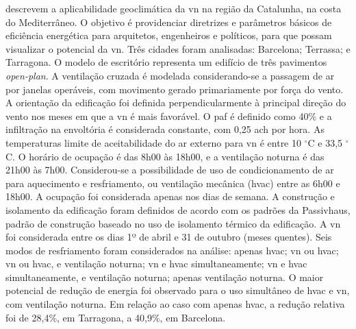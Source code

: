 \documentclass[brazil,hardcopy,openany]{ufscthesis} %
\begin{document}
 descrevem a aplicabilidade geoclimática da \acrshort{vn} na região da Catalunha, na costa do Mediterrâneo. O objetivo é providenciar diretrizes e parâmetros básicos de eficiência energética para arquitetos, engenheiros e políticos, para que possam visualizar o potencial da \acrshort{vn}. Três cidades foram analisadas: Barcelona; Terrassa; e Tarragona. O modelo de escritório representa um edifício de três pavimentos \textit{open-plan}. A ventilação cruzada é modelada considerando-se a passagem de ar por janelas operáveis, com movimento gerado primariamente por força do vento. A orientação da edificação foi definida perpendicularmente à principal direção do vento nos meses em que a \acrshort{vn} é mais favorável. O \acrshort{paf} é definido como 40\% e a infiltração na envoltória é considerada constante, com 0,25 \acrfull{ach} por hora. As temperaturas limite de aceitabilidade do ar externo para \acrshort{vn} é entre 10 $^{\circ}$C e 33,5 $^{\circ}$C. O horário de ocupação é das 8h00 às 18h00, e a ventilação noturna é das 21h00 às 7h00. Considerou-se a possibilidade de uso de condicionamento de ar para aquecimento e resfriamento, ou ventilação mecânica (\acrshort{hvac}) entre as 6h00 e 18h00. A ocupação foi considerada apenas nos dias de semana. A construção e isolamento da edificação foram definidos de acordo com os padrões da Passivhaus, padrão de construção baseado no uso de isolamento térmico da edificação. A \acrshort{vn} foi considerada entre os dias 1º de abril e 31 de outubro (meses quentes). Seis modos de resfriamento foram considerados na análise: apenas \acrshort{hvac}; \acrshort{vn} ou \acrshort{hvac}; \acrshort{vn} ou \acrshort{hvac}, e ventilação noturna; \acrshort{vn} e \acrshort{hvac} simultaneamente; \acrshort{vn} e \acrshort{hvac} simultaneamente, e ventilação noturna; apenas ventilação noturna. O maior potencial de redução de energia foi observado para o uso simultâneo de \acrshort{hvac} e \acrshort{vn}, com ventilação noturna. Em relação ao caso com apenas \acrshort{hvac}, a redução relativa foi de 28,4\%, em Tarragona, a 40,9\%, em Barcelona.
\end{document}
